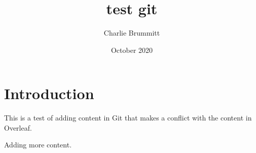 \documentclass{article}
\title{test git}
\author{Charlie Brummitt}
\date{October 2020}
\begin{document}
\maketitle

\section{Introduction}
This is a test of adding content in Git that makes a conflict with the content in Overleaf.

Adding more content.
\end{document}
